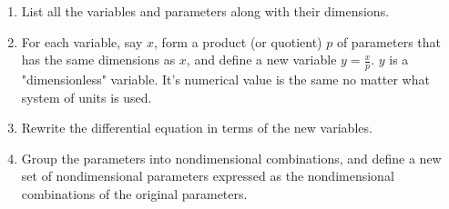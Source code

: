 \documentclass[landscape,final,a0paper,fontscale=0.285]{baposter}
\begin{document}
\begin{poster}
{\begin{center}
\begin{enumerate}
\item
	List all the variables and parameters along with their dimensions.
	
\item
	For each variable, say $x$, form a product (or quotient) $p$ of parameters that has the same dimensions as $x$, and define a new variable $y=\frac{x}{p}.$ $y$ is a "dimensionless" variable. It's numerical  value is the same no matter what system of units is used.
	
\item Rewrite the differential equation in terms of the new variables.

\item 
	Group the parameters into nondimensional combinations, and define a new set of nondimensional parameters expressed as the nondimensional combinations of the original parameters.
	 
\end{enumerate}
\end{center}
}
\end{poster}
\end{document}
